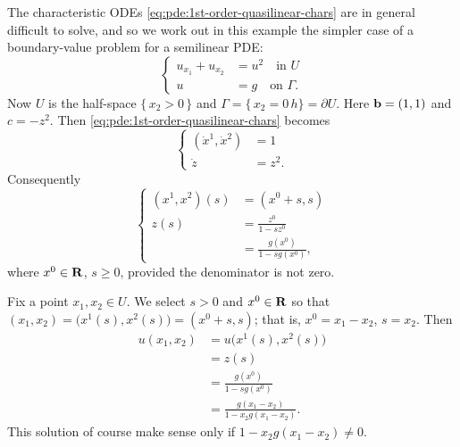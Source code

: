 \begin{example}
  The characteristic ODEs \eqref{eq:pde:1st-order-quasilinear-chars} are in
  general difficult to solve, and so we work out in this example the
  simpler case of a boundary-value problem for a semilinear PDE:
  \begin{equation}
    \label{eq:pde:quasilinear-ex-2}
    \left\{
      \begin{aligned}
        u_{x_1}+u_{x_2}&=u^2\quad\text{in \(U\)}\\
        u&=g\quad\text{on \(\Gamma\).}
      \end{aligned}
    \right.
  \end{equation}
  Now \(U\) is the half-space \(\{\,x_2>0\,\}\) and
  \(\Gamma=\{\,x_2=0\,h\}=\partial U\). Here \(\mathbf{b}=(1,1)\) and
  \(c=-z^2\). Then \eqref{eq:pde:1st-order-quasilinear-chars} becomes
  \[
    \left\{
      \begin{aligned}
        (\dot{x}^1,\dot{x}^2)&=1\\
        \dot z&=z^2.
      \end{aligned}
    \right.
  \]
  Consequently
  \[
    \left\{
    \begin{aligned}
      (x^1,x^2)(s)&=(x^0+s,s)\\
      z(s)&=\frac{z^0}{1-sz^0}\\
      &=\frac{g(x^0)}{1-sg(x^0)},
    \end{aligned}
    \right.
  \]
  where \(x^0\in\mathbf{R}\), \(s\geq 0\), provided the denominator is not zero.

  Fix a point \(x_1,x_2\in U\). We select \(s>0\) and \(x^0\in\mathbf{R}\) so
  that \((x_1,x_2)=\bigl( x^1(s),x^2(s) \bigr)=(x^0+s,s)\); that is,
  \(x^0=x_1-x_2\), \(s=x_2\). Then
  \begin{align*}
    u(x_1,x_2)&=u\bigl( x^1(s),x^2(s) \bigr)\\
              &=z(s)\\
              &=\frac{g(x^0)}{1-sg(x^0)}\\
              &=\frac{g(x_1-x_2)}{1-x_2g(x_1-x_2)}.
  \end{align*}
  This solution of course make sense only if \(1-x_2g(x_1-x_2)\neq 0\).
\end{example}

